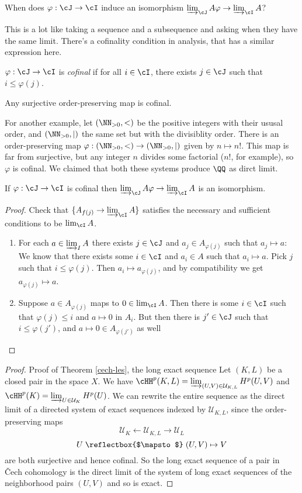 \begin{question}
When does $\varphi:\cJ\to\cI$ induce an isomorphism $\varinjlim_{\cJ}A\varphi\to\varinjlim_{\cI}A$?
\end{question}
This is a lot like taking a sequence and a subsequence and asking when they have the same limit. There's a cofinality condition in analysis, that has a similar expression here.
\begin{definition}
$\varphi:\cJ\to\cI$ is {\em cofinal} if for all $i\in\cI$, there exists $j\in\cJ$ such that $i\leq\varphi(j)$.
\end{definition}
\begin{example}
Any surjective order-preserving map is cofinal. 

For another example, let $(\NN_{>0},<)$ be the positive integers with their
ususal order, and $(\NN_{>0},|)$ the same set but with the divisiblity order.
There is an order-preserving map $\varphi:(\NN_{>0},<)\to(\NN_{>0},|)$ given
by $n\mapsto n!$. This map is far from surjective, but any integer $n$ 
divides some factorial ($n!$, for example), so $\varphi$ is cofinal. 
We claimed that both these systems produce $\QQ$ as dirct limit.
\end{example}
\begin{lemma}
If $\varphi:\cJ\to\cI$ is cofinal then $\varinjlim_{\cJ}A\varphi\to\varinjlim_{\cI}A$ is an isomorphism.
\end{lemma}
\begin{proof}
Check that $\{A_{f(j)}\to\varinjlim_{\cI}A\}$ satisfies the necessary and sufficient conditions to be $\lim_{\cI}A$.
\begin{enumerate}
\item For each $a\in\varinjlim_{I}A$ there exists $j\in\cJ$ and $a_j\in A_{\varphi(j)}$ such that $a_j\mapsto a$: We know that there exists some $i\in\cI$ and $a_i\in A$ such that $a_i\mapsto a$. Pick $j$ such that $i\leq\varphi(j)$. Then $a_i\mapsto a_{\varphi(j)}$, and by compatibility we get $a_{\varphi(j)}\mapsto a$.
\item Suppose $a\in A_{\varphi(j)}$ maps to $0\in\lim_{\cI}A$. Then there is
some $i\in\cI$ such that $\varphi(j)\leq i$ and $a\mapsto0$ in $A_i$. 
But then there is $j'\in\cJ$ such that $i\leq\varphi(j')$, and 
$a\mapsto0\in A_{\varphi(j')}$ as well
\end{enumerate}
\end{proof}

\begin{proof}{Proof of Theorem \ref{cech-les}, the long exact sequence}
Let $(K,L)$ be a closed pair in the space $X$. We have
$\cHH^p(K,L)=\varinjlim_{(U,V)\in\mathcal{U}_{K,L}}H^p(U,V)$ and $\cHH^p(K)=\varinjlim_{U\in\mathcal{U}_K}H^p(U)$. We can rewrite the entire sequence as
the direct limit of a directed system of exact sequences indexed by 
$\mathcal{U}_{K,L}$, since the order-preserving maps 
\[
\mathcal{U}_K \leftarrow \mathcal{U}_{K,L} \rightarrow \mathcal{U}_L 
\]
\[
U \mathrel{\reflectbox{$\mapsto$}} (U,V) \mapsto V
\]
are both surjective and hence cofinal. So the long exact sequence of a pair
in \v{C}ech cohomology is the direct limit of the system of long exact 
sequences of the neighborhood pairs $(U,V)$ and so is exact. 
\end{proof}

